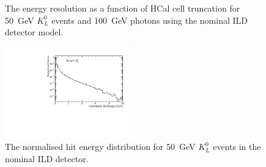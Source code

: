 \begin{figure}[h!]
\caption[The energy resolution as a function of HCal cell truncation for \protect{} 50~GeV $K^{0}_{L}$ events and \protect{} 100~GeV photons using the nominal ILD detector model.]{The energy resolution as a function of HCal cell truncation for \protect{} 50~GeV $K^{0}_{L}$ events and \protect{} 100~GeV photons using the nominal ILD detector model.}
\label{fig:ercelltrunc}
\end{figure}

\begin{figure}[h!]
\includegraphics[width=0.5\textwidth]{EnergyEstimators/Plots/CellTruncation/EnergyDensityDistributions.pdf}
\caption[The normalised hit energy distribution for 50~GeV $K^{0}_{L}$ events in the nominal ILD detector.]{{The normalised hit energy distribution for 50~GeV $K^{0}_{L}$ events in the nominal ILD detector.}}
\label{fig:hitenergydistribution}
\end{figure}

